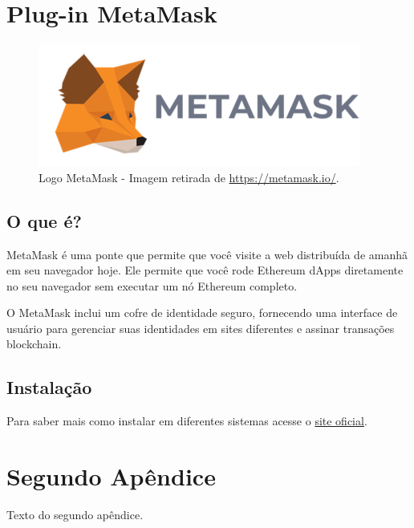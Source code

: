 \begin{apendicesenv}

\partapendices

\chapter{Plug-in MetaMask}

                \begin{figure}[H]
                     \centering
                     \includegraphics[scale=0.7]{figuras/apendices/metamask_logo.png}
                     \caption{Logo MetaMask - Imagem retirada de \url{https://metamask.io/}.}
                     \label{fig:metamask_logo}
                \end{figure}

\section{O que é?}

MetaMask é uma ponte que permite que você visite a web distribuída de amanhã em seu navegador hoje. Ele permite que você rode Ethereum dApps diretamente no seu navegador sem executar um nó Ethereum completo.

O MetaMask inclui um cofre de identidade seguro, fornecendo uma interface de usuário para gerenciar suas identidades em sites diferentes e assinar transações blockchain.

\section{Instalação}


Para saber mais como instalar em diferentes sistemas acesse o \href{www.https://metamask.io/}{site oficial}.



\chapter{Segundo Apêndice}

Texto do segundo apêndice.

\end{apendicesenv}
